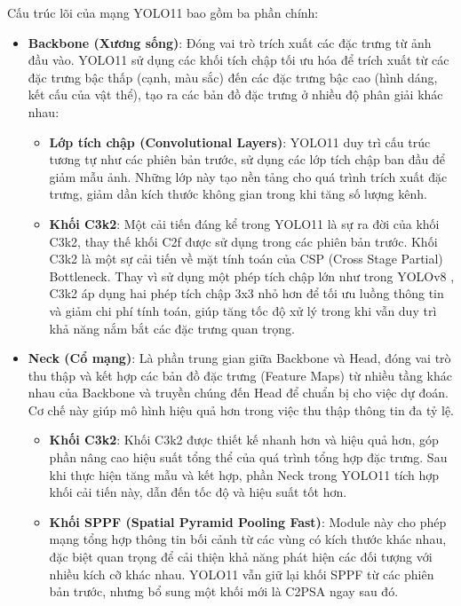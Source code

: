 Cấu trúc lõi của mạng YOLO11 bao gồm ba phần chính:
\begin{itemize}
	\item \textbf{Backbone (Xương sống)}: Đóng vai trò trích xuất các đặc trưng từ ảnh đầu vào. YOLO11 sử dụng các khối tích chập tối ưu hóa để trích xuất từ các đặc trưng bậc thấp (cạnh, màu sắc) đến các đặc trưng bậc cao (hình dáng, kết cấu của vật thể), tạo ra các bản đồ đặc trưng ở nhiều độ phân giải khác nhau:
	\begin{itemize}
		\item[$\circ$] \textbf{Lớp tích chập (Convolutional Layers)}: YOLO11 duy trì cấu trúc tương tự như các phiên bản trước, sử dụng các lớp tích chập ban đầu để giảm mẫu ảnh. Những lớp này tạo nền tảng cho quá trình trích xuất đặc trưng, giảm dần kích thước không gian trong khi tăng số lượng kênh.
		
		\item[$\circ$] \textbf{Khối C3k2}: Một cải tiến đáng kể trong YOLO11 là sự ra đời của khối C3k2, thay thế khối C2f được sử dụng trong các phiên bản trước. Khối C3k2 là một sự cải tiến về mặt tính toán của CSP (Cross Stage Partial) Bottleneck. Thay vì sử dụng một phép tích chập lớn như trong YOLOv8 , C3k2 áp dụng hai phép tích chập 3x3 nhỏ hơn để tối ưu luồng thông tin và giảm chi phí tính toán, giúp tăng tốc độ xử lý trong khi vẫn duy trì khả năng nắm bắt các đặc trưng quan trọng.
	\end{itemize}
	
	\item \textbf{Neck (Cổ mạng)}: Là phần trung gian giữa Backbone và Head, đóng vai trò thu thập và kết hợp các bản đồ đặc trưng (Feature Maps) từ nhiều tầng khác nhau của Backbone và truyền chúng đến Head để chuẩn bị cho việc dự đoán. Cơ chế này giúp mô hình hiệu quả hơn trong việc thu thập thông tin đa tỷ lệ.
	\begin{itemize}
		\item[$\circ$] \textbf{Khối C3k2}: Khối C3k2 được thiết kế nhanh hơn và hiệu quả hơn, góp phần nâng cao hiệu suất tổng thể của quá trình tổng hợp đặc trưng. Sau khi thực hiện tăng mẫu và kết hợp, phần Neck trong YOLO11 tích hợp khối cải tiến này, dẫn đến tốc độ và hiệu suất tốt hơn.
		
		\item[$\circ$] \textbf{Khối SPPF (Spatial Pyramid Pooling Fast)}: Module này cho phép mạng tổng hợp thông tin bối cảnh từ các vùng có kích thước khác nhau, đặc biệt quan trọng để cải thiện khả năng phát hiện các đối tượng với nhiều kích cỡ khác nhau. YOLO11 vẫn giữ lại khối SPPF từ các phiên bản trước, nhưng bổ sung một khối mới là C2PSA ngay sau đó.
		

\end{itemize}
\end{itemize}
